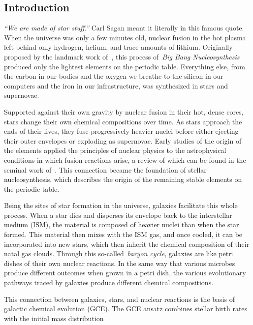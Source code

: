 \documentclass[main.tex]{subfiles}
\begin{document}
\begin{doublespace}

\chapter{Introduction}
\label{main:sec:intro}

\textit{``We are made of star stuff.''}
Carl Sagan meant it literally in this famous quote.
When the universe was only a few minutes old, nuclear fusion in the hot plasma
left behind only hydrogen, helium, and trace amounts of lithium.
Originally proposed by the landmark work of~\citet{Alpher1948}, this process
of~\textit{Big Bang Nucleosynthesis} produced only the lightest elements on the
periodic table.
Everything else, from the carbon in our bodies and the oxygen we breathe to the
silicon in our computers and the iron in our infrastructure, was synthesized in
stars and supernovae.
\par
Supported against their own gravity by nuclear fusion in their hot, dense cores,
stars change their own chemical compositions over time.
As stars approach the ends of their lives, they fuse progressively heavier
nuclei before either ejecting their outer envelopes or exploding as supernovae.
Early studies of the origin of the elements applied the principles of nuclear
physics to the astrophysical conditions in which fusion reactions arise, a
review of which can be found in the seminal work of~\citet*{Burbidge1957}.
This connection became the foundation of stellar nucleosynthesis, which
describes the origin of the remaining stable elements on the periodic table.
\par
Being the sites of star formation in the universe, galaxies facilitate this
whole process.
When a star dies and disperses its envelope back to the interstellar medium
(ISM), the material is composed of heavier nuclei than when the star formed.
This material then mixes with the ISM gas, and once cooled, it can be
incorporated into new stars, which then inherit the chemical composition of
their natal gas clouds.
Through this so-called~\textit{baryon cycle}, galaxies are like petri dishes of
their own nuclear reactions.
In the same way that various microbes produce different outcomes when grown in
a petri dish, the various evolutionary pathways traced by galaxies produce
different chemical compositions.
\par
This connection between galaxies, stars, and nuclear reactions is the basis of
galactic chemical evolution (GCE).
The GCE ansatz combines stellar birth rates with the initial mass distribution

\end{doublespace}
\end{document}

